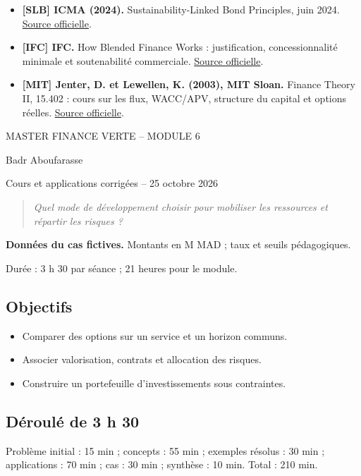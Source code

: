 \documentclass[12pt,a4paper]{article}
\begin{document}
\begin{itemize}
\item \textbf{[SLB] ICMA (2024).} Sustainability-Linked Bond Principles, juin 2024. \href{https://www.icmagroup.org/assets/documents/Sustainable-finance/2024-updates/Sustainability-Linked-Bond-Principles-June-2024.pdf}{Source officielle}.
\item \textbf{[IFC] IFC.} How Blended Finance Works : justification, concessionnalité minimale et soutenabilité commerciale. \href{https://www.ifc.org/en/what-we-do/sector-expertise/blended-finance/how-blended-finance-works}{Source officielle}.
\item \textbf{[MIT] Jenter, D. et Lewellen, K. (2003), MIT Sloan.} Finance Theory II, 15.402 : cours sur les flux, WACC/APV, structure du capital et options réelles. \href{https://ocw.mit.edu/courses/15-402-finance-theory-ii-spring-2003/pages/lecture-notes/}{Source officielle}.
\end{itemize}\normalsize
\clearpage
\begin{center}{\small MASTER FINANCE VERTE -- MODULE 6}\par\vspace{8pt}{\Large\bfseries Séance 4 -- Choix stratégiques : détenir, contractualiser, s’associer}\par\vspace{6pt}Badr Aboufarasse\par{\small Cours et applications corrigées -- 25 octobre 2026}\end{center}
\begin{quote}\itshape Quel mode de développement choisir pour mobiliser les ressources et répartir les risques ?\end{quote}
\textbf{Données du cas fictives.} Montants en M MAD ; taux et seuils pédagogiques.\par Durée : 3 h 30 par séance ; 21 heures pour le module.

\subsection*{Objectifs}
\begin{itemize}\item Comparer des options sur un service et un horizon communs.\item Associer valorisation, contrats et allocation des risques.\item Construire un portefeuille d’investissements sous contraintes.\end{itemize}
\subsection*{Déroulé de 3 h 30}
Problème initial : 15 min ; concepts : 55 min ; exemples résolus : 30 min ; applications : 70 min ; cas : 30 min ; synthèse : 10 min. Total : 210 min.
\end{document}
